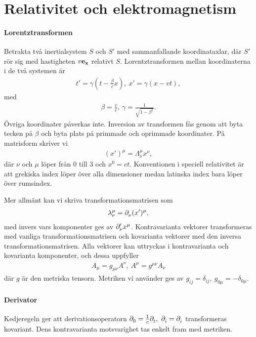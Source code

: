 \section{Relativitet och elektromagnetism}

\paragraph{Lorentztransformen}
Betrakta två inertialsystem $S$ och $S'$ med sammanfallande koordinataxlar, där $S'$ rör sig med hastigheten $v\vb{e}_{\vb{x}}$ relativt $S$. Lorentztransformen mellan koordinaterna i de två systemen är
\begin{align*}
	t' = \gamma\left(t - \frac{\beta}{c}x\right),\ x' = \gamma(x - vt),
\end{align*}
med
\begin{align*}
	\beta = \frac{v}{c},\ \gamma = \frac{1}{\sqrt{1 - \beta^{2}}}.
\end{align*}
Övriga koordinater påverkas inte. Inversion av transformen fås genom att byta tecken på $\beta$ och byta plats på primmade och oprimmade koordinater. På matrisform skriver vi
\begin{align*}
	(x')^{\mu} = \Lambda_{\nu}^{\mu}x^{\nu},
\end{align*}
där $\nu$ och $\mu$ löper från $0$ till $3$ och $x^{0} = ct$. Konventionen i speciell relativitet är att grekiska index löper över alla dimensioner medan latinska index bara löper över rumsindex.

Mer allmänt kan vi skriva transformationsmatrisen som
\begin{align*}
	\lambda_{\nu}^{\mu} = \partial_{\nu}^{}(x')^{\mu},
\end{align*}
med invers vars komponenter ges av $\partial_{\nu}^{\prime}x^{\mu}$. Kontravarianta vektorer transformeras med vanliga transformationsmatrisen och kovarianta vektorer med den inversa transformationsmatrisen. Alla vektorer kan uttryckas i kontravarianta och kovarianta komponenter, och dessa uppfyller
\begin{align*}
	A_{\mu} = g_{\mu\nu}A^{\nu},\ A^{\mu} = g^{\mu\nu}A_{\nu}
\end{align*}
där $g$ är den metriska tensorn. Metriken vi använder ges av $g_{ij} = \delta_{ij},\ g_{0\mu} = -\delta_{0\mu}$.

\paragraph{Derivator}
Kedjeregeln ger att derivationsoperatorn $\partial_{0}^{} = \frac{1}{c}\partial_{t}^{},\ \partial_{i}^{} = \partial_{i}^{}$ transformeras kovariant. Dens kontravarianta motsvarighet tas enkelt fram med metriken.

